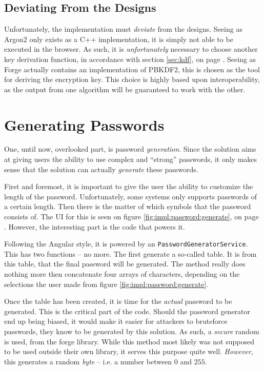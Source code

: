 		\subsection{Deviating From the Designs}
			Unfortunately, the implementation must \emph{deviate} from the designs. Seeing as Argon2 only exists as a C++ implementation, it is simply not able to be executed in the browser. As such, it is \emph{unfortunately} necessary to choose another key derivation function, in accordance with section \ref{sec:kdf}, on page \pageref{sec:kdf}. Seeing as Forge actually contains an implementation of PBKDF2, this is chosen as the tool for deriving the encryption key. This choice is highly based upon interoperability, as the output from one algorithm will be guaranteed to work with the other.



	\section{Generating Passwords}
		One, until now, overlooked part, is password \emph{generation}. Since the solution aims at giving users the ability to use complex and ``strong'' passwords, it only makes sense that the solution can actually \emph{generate} these passwords.

		First and foremost, it is important to give the user the ability to customize the length of the password. Unfortunately, some systems only supports passwords of a certain length. Then there is the matter of which symbols that the password consists of. The UI for this is seen on figure \ref{fig:impl:password:generate}, on page \pageref{fig:impl:password:generate}. However, the interesting part is the code that powers it.

		Following the Angular style, it is powered by an \verb=PasswordGeneratorService=. This has two functions -- no more. The first generate a so-called table. It is from this table, that the final password will be generated. The method really does nothing more then concatenate four arrays of characters, depending on the selections the user made from figure \ref{fig:impl:password:generate}.

		Once the table has been created, it is time for the \emph{actual} password to be generated. This is the critical part of the code. Should the password generator end up being biased, it would make it easier for attackers to bruteforce passwords, they know to be generated by this solution. As such, a \emph{secure} random is used, from the forge library. While this method most likely was not supposed to be used outside their own library, it serves this purpose quite well. \emph{However}, this generates a random \emph{byte} -- i.e. a number between $0$ and $255$.

